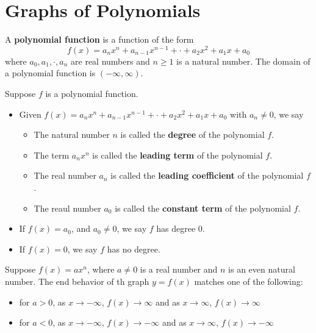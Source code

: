 \section{Graphs of Polynomials}

\begin{definition}
    A \textbf{polynomial function} is a function of the form
    \[f(x) = a_n x^n + a_{n-1}x^{n-1} + \cdot + a_2x^2 + a_1x + a_0\]
    where $a_0, a_1, \cdot, a_n$ are real numbers and $n \geq 1$ is a natural number. The domain of a polynomial function is $(-\infty, \infty)$.
\end{definition}

\begin{definition}
    Suppose $f$ is a polynomial function.
    \begin{itemize}
        \item Given $f(x) = a_n x^n + a_{n-1}x^{n-1} + \cdot + a_2x^2 + a_1x + a_0$ with $a_n \neq 0$, we say
              \begin{itemize}[label=-]
                  \item The natural number $n$ is called the \textbf{degree} of the polynomial $f$.
                  \item The term $a_n x^n$ is called the \textbf{leading term} of the polynomial $f$.
                  \item The real number $a_n$ is called the \textbf{leading coefficient} of the polynomial $f$.
                  \item The reaul number $a_0$ is called the \textbf{constant term} of the polynomial $f$.
              \end{itemize}
        \item If $f(x) = a_0$, and $a_0 \neq 0$, we say $f$ has degree 0.
        \item If $f(x) = 0$, we say $f$ has no degree.
    \end{itemize}
\end{definition}

\begin{definition}[End Behavior of Functions $f(x)=ax^n$, n is even]
    Suppose $f(x) = ax^n$, where $a \neq 0$ is a real number and $n$ is an even natural number. The end behavior of th graph $y=f(x)$ matches one of the following:
    \begin{itemize}
        \item for $a>0$, as $x \to -\infty$, $f(x)\to \infty$ and as $x \to \infty$, $f(x) \to \infty$
        \item for $a<0$, as $x \to -\infty$, $f(x)\to -\infty$ and as $x \to \infty$, $f(x) \to -\infty$
    \end{itemize}
\end{definition}

